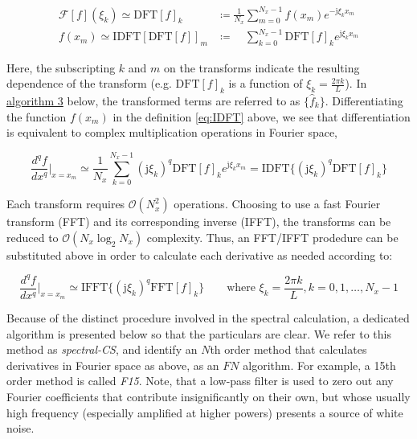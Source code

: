 \documentclass[11pt,titlepage]{report}
\begin{document}
\begin{subequations}
\begin{align}
\mathcal{F}[f](\xi_k) \simeq \text{DFT}[f]_k & \coloneqq  \frac{1}{N_x} \sum_{m = 0}^{N_x - 1} f(x_m) e^{-\text{j}\xi_k x_m} \label{eq:DFT}\\[0.3em] 
f(x_m) \simeq \text{IDFT}[\text{DFT}[f]]_m & \coloneqq  \phantom{\frac{1}{N_x}} \sum_{k = 0}^{N_x - 1}\text{DFT}[f]_k e^{\text{j}\xi_k x_m} \label{eq:IDFT}
\end{align}
\end{subequations}

\noindent Here, the subscripting $k$ and $m$ on the transforms indicate the resulting dependence of the transform (e.g. $\text{DFT}[f]_k$ is a function of $\xi_k = \tfrac{2\pi k}{L}$). In \hyperlink{alg:3}{algorithm 3} below, the transformed terms are referred to as $\{\hat{f}_k\}$. Differentiating the function $f(x_m)$ in the definition \eqref{eq:IDFT} above, we see that differentiation is equivalent to complex multiplication operations in Fourier space,



$$\frac{d^qf}{dx^q}\biggr|_{x = x_m}  \simeq  \frac{1}{N_x} \sum_{k = 0}^{N_x - 1}(\text{j}\xi_k)^q\text{DFT}[f]_k e^{\text{j}\xi_k x_m} = \text{IDFT}\{(\text{j}\xi_k)^q\text{DFT}[f]_k\}$$

\noindent Each transform requires $\mathcal{O}(N_x^2)$ operations. Choosing to use a fast Fourier transform (FFT) and its corresponding inverse (IFFT), the transforms can be reduced to $\mathcal{O}(N_x\log_2 N_x)$ complexity. Thus, an FFT/IFFT prodedure can be substituted above in order to calculate each derivative as needed according to:

\begin{equation}
\boxed{\frac{d^qf}{dx^q}\biggr|_{x = x_m}  \simeq \text{IFFT}\{(\text{j}\xi_k)^q\text{FFT}[f]_k\}} \qquad \text{where } \xi_k = \frac{2\pi k}{L}, k = 0, 1, \ldots, N_x - 1 \label{eq:FFT_deriv}
\end{equation}
 
\noindent Because of the distinct procedure involved in the spectral calculation, a dedicated algorithm is presented below so that the particulars are clear. We refer to this method as \emph{spectral-CS}, and identify an $N$th order method that calculates derivatives in Fourier space as above, as an $FN$ algorithm. For example, a 15th order method is called \emph{F15}. Note, that a low-pass filter is used to zero out any Fourier coefficients that contribute insignificantly on their own, but whose usually high frequency (especially amplified at higher powers) presents a source of white noise.\\[0.3em]
\end{document}
